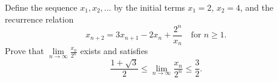 \documentclass{article}
\begin{document}
\setlength{\parindent}{0pt}
Define the sequence $x_1,x_2,\ldots$ by the initial terms $x_1=2$, $x_2=4$, and the recurrence relation$$x_{n+2}=3x_{n+1}-2x_n+\frac{2^ n}{x_n}\quad\text{for }n\geq 1.$$Prove that $\displaystyle\lim\limits_{n \to \infty}\frac{x_n}{2^ n}$ exists and satisfies$$\frac{1+\sqrt{3}}{2}\leq\lim\limits_{n \to \infty}\dfrac{x_n}{2^ n}\leq\frac{3}{2}.$$
\end{document}
